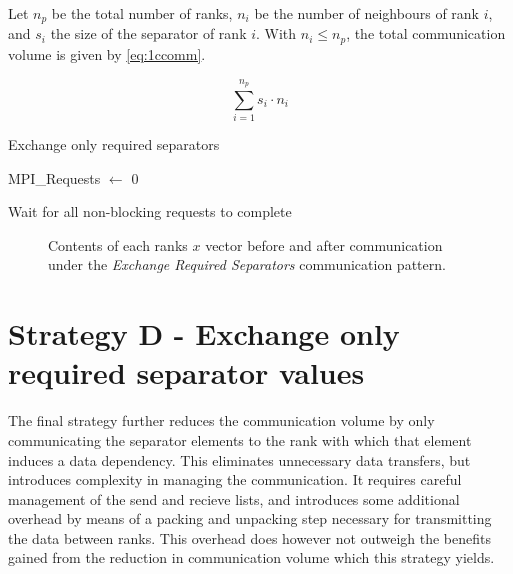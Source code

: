 Let \(n_{p}\) be the total number of ranks, \(n_{i}\) be the number of neighbours of rank \(i\), and \(s_{i}\) the size of the separator of rank \(i\). With \(n_{i} \leq n_{p}\), the total communication volume is given by \ref{eq:1ccomm}.

\begin{equation}
    \label{eq:1ccomm}
    \sum_{i=1}^{n_{p}} s_i \cdot  n_{i} 
\end{equation}

\begin{algorithm}[H]
    \label{alg:1ccomm}
    \caption{Exchange only required separators}
    \SetAlgoVlined
    \Output{\newline}

    MPI\_Requests \(\gets\) 0\\
 

    Wait for all non-blocking requests to complete\\
\end{algorithm}


\begin{figure}[H]
    \centering
    \caption{Contents of each ranks \(x\) vector before and after communication under the \textit{Exchange Required Separators} communication pattern.}
    \label{fig:1ccomm}
\end{figure}

\section{Strategy D - Exchange only required separator values}
The final strategy further reduces the communication volume by only communicating the separator elements to the rank with which that element induces a data dependency. This eliminates unnecessary data transfers, but introduces complexity in managing the communication. It requires careful management of the send and recieve lists, and introduces some additional overhead by means of a packing and unpacking step necessary for transmitting the data between ranks. This overhead does however not outweigh the benefits gained from the reduction in communication volume which this strategy yields.
\medskip

